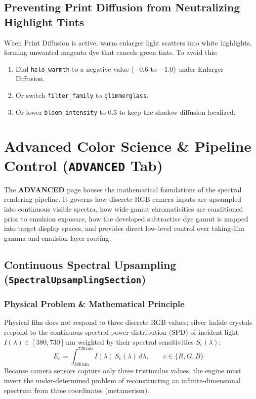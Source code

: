 \documentclass[11pt,a4paper]{article}
\begin{document}
\subsection{Preventing Print Diffusion from Neutralizing Highlight Tints}
When Print Diffusion is active, warm enlarger light scatters into white highlights, forming unwanted magenta dye that cancels green tints. To avoid this:
\begin{enumerate}[leftmargin=*]
    \item Dial \texttt{halo\_warmth} to a negative value ($-0.6$ to $-1.0$) under Enlarger Diffusion.
    \item Or switch \texttt{filter\_family} to \texttt{glimmerglass}.
    \item Or lower \texttt{bloom\_intensity} to $0.3$ to keep the shadow diffusion localized.
\end{enumerate}

\newpage

\section{Advanced Color Science \& Pipeline Control (\texttt{ADVANCED} Tab)}

The \textbf{ADVANCED} page houses the mathematical foundations of the spectral rendering pipeline. It governs how discrete RGB camera inputs are upsampled into continuous visible spectra, how wide-gamut chromaticities are conditioned prior to emulsion exposure, how the developed subtractive dye gamut is mapped into target display spaces, and provides direct low-level control over taking-film gamma and emulsion layer routing.

\subsection{Continuous Spectral Upsampling (\texttt{SpectralUpsamplingSection})}

\subsubsection{Physical Problem \& Mathematical Principle}
Physical film does not respond to three discrete RGB values; silver halide crystals respond to the continuous spectral power distribution (SPD) of incident light $I(\lambda) \in [380, 730]\,\text{nm}$ weighted by their spectral sensitivities $S_c(\lambda)$:
\begin{equation}
E_c = \int_{380\,\text{nm}}^{730\,\text{nm}} I(\lambda) \, S_c(\lambda) \, d\lambda, \qquad c \in \{R, G, B\}
\end{equation}
Because camera sensors capture only three tristimulus values, the engine must invert the under-determined problem of reconstructing an infinite-dimensional spectrum from three coordinates (metamerism).
\end{document}
